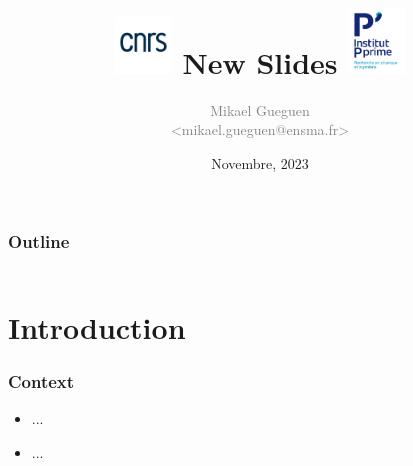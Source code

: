 \documentclass[aspectratio=169,utf8]{beamer}
\title[Beamer Slides]{\centering \includegraphics[width=1.5cm]{./figs/cnrs-logo_cnrs_2019_blanc} New Slides  \includegraphics[width=1.5cm]{./figs/logo_pprime.png}}
\author[MG]{\scriptsize \textcolor{gray}{Mikael Gueguen\\ <mikael.gueguen@ensma.fr>}}
\date{Novembre, $2023$}
\begin{document}
\addtocounter{framenumber}{-1}


\begin{frame}
  \titlepage
\end{frame}

\begin{frame}
  \frametitle{Outline}

  \centering

  \begin{minipage}{.75\textwidth}

    \begin{columns}[t]
      \begin{column}{.5\textwidth}
        \tableofcontents[sections={1-5}]
      \end{column}
      \begin{column}{.5\textwidth}
        \tableofcontents[sections={6-10}]
      \end{column}
    \end{columns}

  \end{minipage}

\end{frame}


\section{Introduction}

\begin{frame}
  \frametitle{Context}

  \begin{itemize}
    \setlength{\itemsep}{8pt}
    	\item ...
	\item ...
  \end{itemize}

\end{frame}
\end{document}
